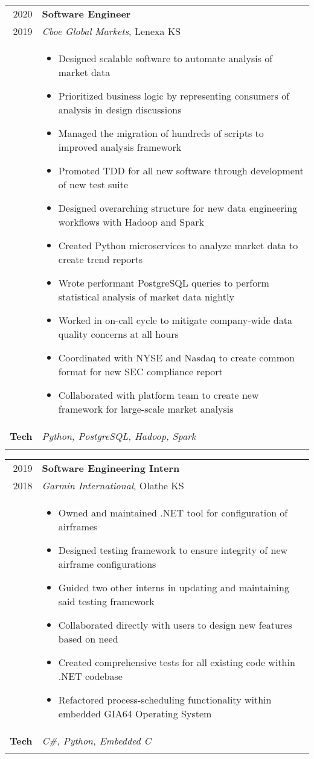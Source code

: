 \documentclass[a4paper,10pt]{article}
\newcommand{\br}{\\\multicolumn{2}{c}{}}
\begin{document}
\begin{tabular}{r p{15cm}}
  \textsc{2020}  & \textbf{Software Engineer} \\
  \textsc{2019}  & \textit{Cboe Global Markets}, Lenexa KS
  \\ &
       \begin{itemize}
       \item Designed scalable software to automate analysis of market data
       \item Prioritized business logic by representing consumers of analysis in design discussions
       \item Managed the migration of hundreds of scripts to improved analysis framework
       \item Promoted TDD for all new software through development of new test suite
       \item Designed overarching structure for new data engineering workflows with Hadoop and Spark
       \item Created Python microservices to analyze market data to create trend reports
       \item Wrote performant PostgreSQL queries to perform statistical analysis of market data nightly
       \item Worked in on-call cycle to mitigate company-wide data quality concerns at all hours
       \item Coordinated with NYSE and Nasdaq to create common format for new SEC compliance report
       \item Collaborated with platform team to create new framework for large-scale market analysis
       \end{itemize} \\
  \textbf{Tech} & \textit{Python, PostgreSQL, Hadoop, Spark} \br \\
\end{tabular}

\begin{tabular}{r p{15cm}}
  \textsc{2019} & \textbf{Software Engineering Intern} \\
  \textsc{2018} & \textit{Garmin International}, Olathe KS
  \\ &
       \begin{itemize}
       \item Owned and maintained .NET tool for configuration of airframes
       \item Designed testing framework to ensure integrity of new airframe configurations
       \item Guided two other interns in updating and maintaining said testing framework
       \item Collaborated directly with users to design new features based on need
       \item Created comprehensive tests for all existing code within .NET codebase
       \item Refactored process-scheduling functionality within embedded GIA64 Operating System

       \end{itemize} \\
  \textbf{Tech} & \textit{C\#, Python, Embedded C} \br \\
\end{tabular}
\end{document}
